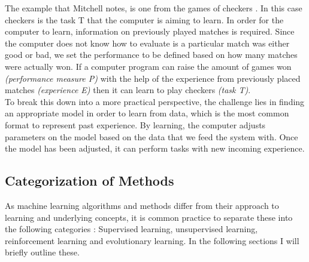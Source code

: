 The example that Mitchell notes, is one from the games of checkers \cite{mitchell2006discipline}. In this case checkers is the task T that the computer is aiming to learn. In order for the computer to learn, information on previously played matches is required. Since the computer does not know how to evaluate is a particular match was either good or bad, we set the performance to be defined based on how many matches were actually won. If a computer program can raise the amount of games won \textit{(performance measure P)} with the help of the experience from previously placed matches \textit{(experience E)} then it can learn to play checkers \textit{(task T)}. \\

To break this down into a more practical perspective, the challenge lies in finding an appropriate model in order to learn from data, which is the most common format to represent past experience. By learning, the computer adjusts parameters on the model based on the data that we feed the system with. Once the model has been adjusted, it can perform tasks with new incoming experience.

\subsection{Categorization of Methods}
As machine learning algorithms and methods differ from their approach to learning and underlying concepts, it is common practice to separate these into the following categories \cite{Duda:2000:PC:954544, Marsland:2009:MLA:1571643}  : Supervised learning, unsupervised learning, reinforcement learning and evolutionary learning. In the following sections I will briefly outline these.\\

